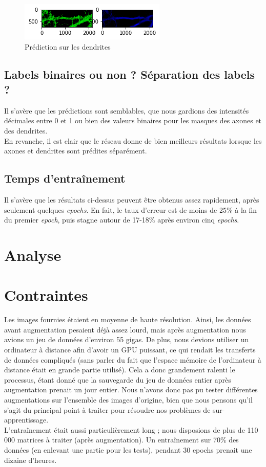\documentclass{report}
\begin{document}
\begin{figure}[H]
\centering
\includegraphics[scale=0.8]{"397_result"}
\caption{Prédiction sur les dendrites}
\end{figure}

\section{Labels binaires ou non ? Séparation des labels ?}

Il s'avère que les prédictions sont semblables, que nous gardions des intensités
décimales entre 0 et 1 ou bien des valeurs binaires pour les masques des axones
et des dendrites. \\
En revanche, il est clair que le réseau donne de bien meilleurs résultats lorsque
les axones et dendrites sont prédites séparément.

\section{Temps d'entraînement}

Il s'avère que les résultats ci-dessus peuvent être obtenus assez rapidement, après
seulement quelques \textit{epochs}. En fait, le taux d'erreur est de moins de 25\%
à la fin du premier \textit{epoch}, puis stagne autour de 17-18\% après environ cinq
\textit{epochs}.


\chapter{Analyse}

\chapter{Contraintes}

Les images fournies étaient en moyenne de haute résolution. Ainsi, les données
avant augmentation pesaient déjà assez lourd, mais après augmentation nous
avions un jeu de données d'environ 55 gigas. De plus, nous devions utiliser un
ordinateur à distance afin d'avoir un GPU puissant, ce qui rendait les transferts
de données compliqués (sans parler du fait que l'espace mémoire de l'ordinateur
à distance était en grande partie utilisé). Cela a donc grandement ralenti le
processus, étant donné que la sauvegarde du jeu de données entier après augmentation
prenait un jour entier. Nous n'avons donc pas pu tester différentes augmentations
sur l'ensemble des images d'origine, bien que nous pensons qu'il s'agit du principal
point à traiter pour résoudre nos problèmes de sur-apprentissage. \\
L'entraînement était aussi particulièrement long ; nous disposions de plus de
110 000 matrices à traiter (après augmentation). Un entraînement sur 70\% des
données (en enlevant une partie pour les tests), pendant 30 epochs prenait une
dizaine d'heures.
\end{document}
